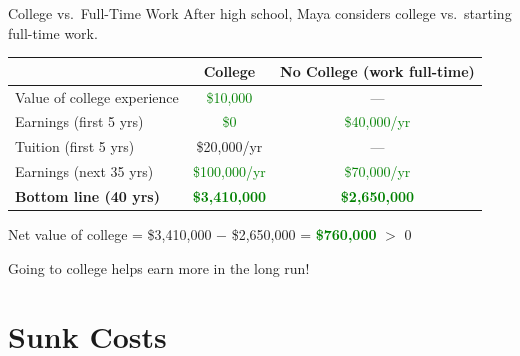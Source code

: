 \documentclass[9pt,english,aspectratio=169]{beamer}
\begin{document}
\begin{frame}{College vs.\ Full-Time Work}
  \vspace{-0.2em}
  After high school, Maya considers college vs.\ starting full-time work.

  \vspace{0.3em}
  \centering
  \begin{tabular}{l c c}
    \toprule
    & \textbf{College} & \textbf{No College (work full-time)} \\
    \midrule
    Value of college experience    & \textcolor{green}{\$10,000}     & --- \\
    Earnings (first 5 yrs)         & \textcolor{green}{\$0}          & \textcolor{green}{\$40,000/yr} \\
    Tuition  (first 5 yrs)         & \textcolor{vermillion}{\$20,000/yr}  & --- \\
    Earnings (next 35 yrs)         & \textcolor{green}{\$100,000/yr} & \textcolor{green}{\$70,000/yr} \\
    \midrule
    \textbf{Bottom line (40 yrs)}  & \textcolor{green}{\textbf{\$3,410,000}} & \textcolor{green}{\textbf{\$2,650,000}} \\
    \bottomrule
  \end{tabular}

  \vspace{0.5em}
  Net value of college = \$3{,}410{,}000 $-$ \$2{,}650{,}000 = \textcolor{green}{\textbf{\$760{,}000}} $>$ 0

  \vspace{0.3em}
  \begin{insightbox}
    Going to college helps earn more in the long run!
  \end{insightbox}


\end{frame}



\section{Sunk Costs}
\end{document}

